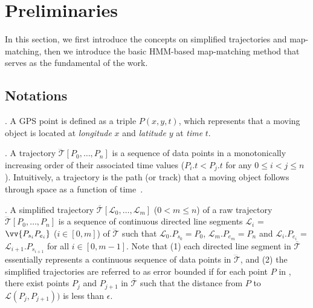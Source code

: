 



\section{Preliminaries}
\label{sec-pre}




In this section, we first introduce the concepts on simplified trajectories and map-matching, then we introduce the basic HMM-based map-matching method that serves as the fundamental of the work.

\subsection{Notations}


. A GPS point is defined as a triple $P(x, y, t)$,
which represents that a moving object is located at {\em longitude} $x$ and {\em
  latitude} $y$ at {\em time} $t$.

. A trajectory
$\dddot{\mathcal{T}}[P_0, \ldots, P_n]$ is a sequence of data points in a
monotonically increasing order of their associated time values ($P_i.t <
P_j.t$ for any $0\le i<j\le n$). Intuitively, a trajectory is the path (or
track) that a moving object follows through space as a function of time~\cite{physics-trajectory}.



. A simplified trajectory $\overline{\mathcal{T}}[\mathcal{L}_0, \ldots , \mathcal{L}_m]$ ($0< m \le n$) of a raw trajectory $\dddot{\mathcal{T}}[P_0, \ldots, P_n]$ is a sequence of continuous directed line segments $\mathcal{L}_{i}$ = $\vv{P_{s_i}P_{e_i}}$ ($i\in[0,m]$) of $\dddot{\mathcal{T}}$  such that $\mathcal{L}_{0}.P_{s_0} = P_0$, $\mathcal{L}_{m}.P_{e_m} = P_n$ and  $\mathcal{L}_{i}.P_{e_i}$ = $\mathcal{L}_{i+1}.P_{s_{i+1}}$ for all $i\in[0, m-1]$.
Note that (1) each directed line segment in $\overline{\mathcal{T}}$ essentially represents a continuous sequence of data points in $\dddot{\mathcal{T}}$, and
(2) the simplified trajectories are referred to {as} error bounded if for each point $P$ in , there exist points $P_j$ and $P_{j+1}$ in $\overline{\mathcal{T}}$ such that the distance from $P$ to $\mathcal{L}(P_j,P_{j+1}))$ is less than $\epsilon$.

